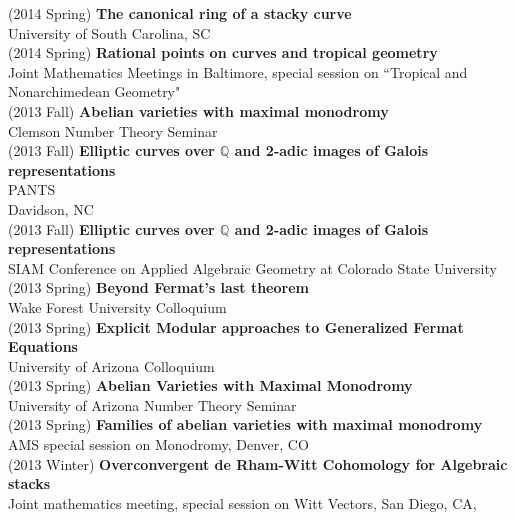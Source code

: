 \documentclass[margin,line]{res}
\begin{document}
\begin{resume}
(2014 Spring) \textbf{The canonical ring of a stacky curve}\\  
University of South Carolina, SC
\vspace{.05cm}\\
(2014 Spring) \textbf{Rational points on curves and tropical geometry}\\  
Joint Mathematics Meetings in Baltimore, special session on ``Tropical and Nonarchimedean Geometry"  
\vspace{.05cm}\\
(2013 Fall) \textbf{Abelian varieties with maximal monodromy}\\  
Clemson Number Theory Seminar 
\vspace{.05cm}\\
(2013 Fall) \textbf{Elliptic curves over $\mathbb{Q}$ and 2-adic images of Galois representations}\\  
PANTS\\ Davidson, NC
\vspace{.05cm}\\
(2013 Fall) \textbf{Elliptic curves over $\mathbb{Q}$ and 2-adic images of Galois representations}\\  
SIAM Conference on Applied Algebraic Geometry at Colorado State University 
\vspace{.05cm}\\
(2013 Spring) \textbf{Beyond Fermat's last theorem}\\
Wake Forest University Colloquium
\vspace{.05cm}\\
(2013 Spring) \textbf{Explicit Modular approaches to Generalized Fermat Equations}\\
University of Arizona Colloquium
\vspace{.05cm}\\
(2013 Spring) \textbf{Abelian Varieties with Maximal Monodromy}\\
University of Arizona Number Theory Seminar 
\vspace{.05cm}\\
(2013 Spring) \textbf{Families of abelian varieties with maximal monodromy}\\
AMS special session on Monodromy, 
Denver, CO
\vspace{.05cm}\\
(2013 Winter) \textbf{Overconvergent de Rham-Witt Cohomology for Algebraic stacks}\\
Joint mathematics meeting, special session on Witt Vectors, San Diego, CA, 
\vspace{.05cm}\\

\end{resume}
\end{document}

